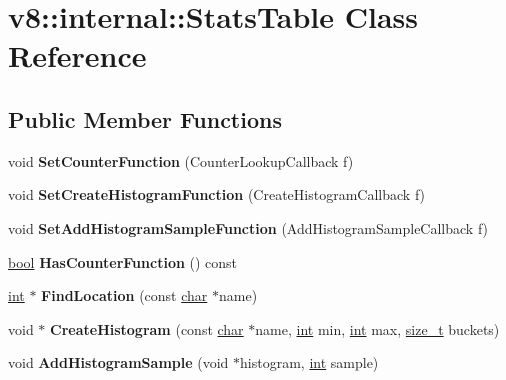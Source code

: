 \hypertarget{classv8_1_1internal_1_1StatsTable}{}\section{v8\+:\+:internal\+:\+:Stats\+Table Class Reference}
\label{classv8_1_1internal_1_1StatsTable}
\subsection*{Public Member Functions}
\begin{DoxyCompactItemize}
\item 
\mbox{\label{classv8_1_1internal_1_1StatsTable_a8b3d3e6111d0e6fc92e2c5fac1d7bf63}} 
void {\bfseries Set\+Counter\+Function} (Counter\+Lookup\+Callback f)
\item 
\mbox{\label{classv8_1_1internal_1_1StatsTable_aed9d933a4c6b5f41a43e53d9d9f6fac8}} 
void {\bfseries Set\+Create\+Histogram\+Function} (Create\+Histogram\+Callback f)
\item 
\mbox{\label{classv8_1_1internal_1_1StatsTable_a91179b8d1c0e9f9ec3761ca189925dfb}} 
void {\bfseries Set\+Add\+Histogram\+Sample\+Function} (Add\+Histogram\+Sample\+Callback f)
\item 
\mbox{\label{classv8_1_1internal_1_1StatsTable_a607e4515194c726815a932296a1642bb}} 
\mbox{\hyperlink{classbool}{bool}} {\bfseries Has\+Counter\+Function} () const
\item 
\mbox{\label{classv8_1_1internal_1_1StatsTable_a2f44cca1e2acf134a52485e02c79e70c}} 
\mbox{\hyperlink{classint}{int}} $\ast$ {\bfseries Find\+Location} (const \mbox{\hyperlink{classchar}{char}} $\ast$name)
\item 
\mbox{\label{classv8_1_1internal_1_1StatsTable_a0dd8ef255a6791a7132f44b4360ed68b}} 
void $\ast$ {\bfseries Create\+Histogram} (const \mbox{\hyperlink{classchar}{char}} $\ast$name, \mbox{\hyperlink{classint}{int}} min, \mbox{\hyperlink{classint}{int}} max, \mbox{\hyperlink{classsize__t}{size\+\_\+t}} buckets)
\item 
\mbox{\label{classv8_1_1internal_1_1StatsTable_a225a48909c94185e3a5f7b7f39bb33e1}} 
void {\bfseries Add\+Histogram\+Sample} (void $\ast$histogram, \mbox{\hyperlink{classint}{int}} sample)
\end{DoxyCompactItemize}
